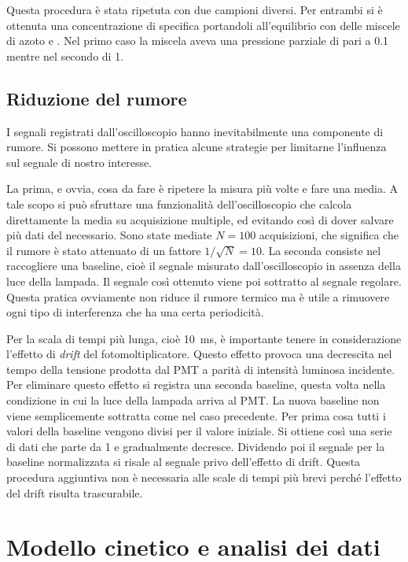 \documentclass[11pt, a4paper]{article}
\begin{document}
Questa procedura è stata ripetuta con due campioni diversi.
Per entrambi si è ottenuta una concentrazione di  specifica portandoli all'equilibrio con delle miscele di azoto e .
Nel primo caso la miscela aveva una pressione parziale di  pari a \qty{0.1}{\atm} mentre nel secondo di \qty{1}{\atm}.

\subsection{Riduzione del rumore}

I segnali registrati dall'oscilloscopio hanno inevitabilmente una componente di rumore. Si possono mettere in pratica alcune strategie per limitarne l'influenza sul segnale di nostro interesse.

La prima, e ovvia, cosa da fare è ripetere la misura più volte e fare una media. A tale scopo si può sfruttare una funzionalità dell'oscilloscopio che calcola direttamente la media su acquisizione multiple, ed evitando così di dover salvare più dati del necessario.
Sono state mediate $N=100$ acquisizioni, che significa che il rumore è stato attenuato di un fattore $1/\sqrt{N} = 10$.
La seconda consiste nel raccogliere una baseline, cioè il segnale misurato dall'oscilloscopio in assenza della luce della lampada. Il segnale così ottenuto viene poi sottratto al segnale regolare.
Questa pratica ovviamente non riduce il rumore termico ma è utile a rimuovere ogni tipo di interferenza che ha una certa periodicità.

Per la scala di tempi più lunga, cioè \qty{10}{\milli\second}, è importante tenere in considerazione l'effetto di \emph{drift} del fotomoltiplicatore. Questo effetto provoca una decrescita nel tempo della tensione prodotta dal PMT a parità di intensità luminosa incidente.
Per eliminare questo effetto si registra una seconda baseline, questa volta nella condizione in cui la luce della lampada arriva al PMT.
La nuova baseline non viene semplicemente sottratta come nel caso precedente. Per prima cosa tutti i valori della baseline vengono divisi per il valore iniziale.
Si ottiene così una serie di dati che parte da 1 e gradualmente decresce. Dividendo poi il segnale per la baseline normalizzata si risale al segnale privo dell'effetto di drift.
Questa procedura aggiuntiva non è necessaria alle scale di tempi più brevi perché l'effetto del drift risulta trascurabile.

\section{Modello cinetico e analisi dei dati}
\end{document}
